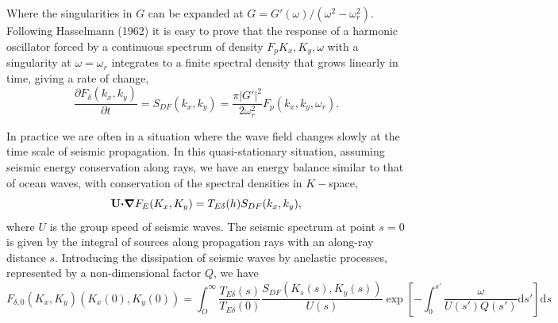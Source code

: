 Where the singularities in $G$ can be expanded at  $G=G'(\omega)/(\omega^2-\omega_r^2)$. 
Following Hasselmann (1962)%
 it is easy to prove that 
the response of a harmonic oscillator forced by  a continuous spectrum of density $F_p{K_x,K_y,\omega}$ with a singularity at $\omega = \omega_r$
integrates to a finite spectral density 
that grows linearly in time, giving a rate of change, 
\begin{equation}
\frac{\partial F_\delta(k_x,k_y)}{\partial t} =  S_{DF}(k_x,k_y)=\frac{\pi \left|G'\right|^2}{2 \omega_r^2}F_{p}(k_x,k_y,\omega_r).
\end{equation}

In practice we are often in a situation where the wave field changes slowly at the time scale of seismic propagation. 
In this quasi-stationary situation, assuming seismic energy conservation along rays, 
we have an energy balance similar to that of ocean waves, with conservation of the 
spectral densities in $K-$space, 
\begin{equation}
\mathbf{U} \mbox{\boldmath $\cdot$} \mbox{\boldmath $\nabla$}{F_{E}}(K_x,K_y) =  T_{E \delta}(h) S_{DF}(k_x,k_y),
\end{equation}
where $U$ is the group speed of seismic waves.
The seismic spectrum at point $s=0$ is given by the integral 
of sources along propagation rays with an along-ray distance $s$. 
Introducing the dissipation of seismic waves by anelastic processes, represented by a non-dimensional factor $Q$, we have
\begin{equation}
F_{\delta,0}(K_x,K_y)(K_{x}(0),K_{y}(0)) = \int_O^\infty \frac{T_{E \delta}(s)}{T_{E \delta}(0)} \frac{S_{DF}(K_{s}(s),K_{y}(s))}{U(s)}
 \exp\left[-\int_0^{s'} \frac{\omega}{U(s')Q(s')} {\mathrm d}s'\right] \mathrm{d} s
\end{equation}

